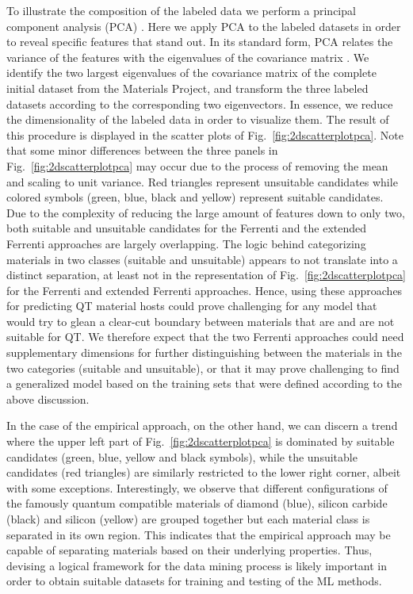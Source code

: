 \documentclass[superscriptaddress,unsortedaddress,
 amsmath,amssymb,
 aps,
]{revtex4-2}
\begin{document}
To illustrate the composition of the labeled data we perform a principal component analysis (PCA) \cite{Jolliffe2002}. Here we apply PCA to the labeled datasets in order to reveal specific features that stand out. In its standard  form, PCA relates the variance of the features with the eigenvalues of the covariance matrix \cite{Jolliffe2002,Murphy2012,Hastie2009}. We identify the two largest eigenvalues of the covariance matrix \cite{Hastie2009} of the complete initial dataset from the Materials Project, and transform the three labeled datasets according to the corresponding two eigenvectors. In essence, we reduce the dimensionality of the labeled data in order to visualize them.
The result of this procedure is displayed in the scatter plots of Fig.~\ref{fig:2dscatterplotpca}. Note that some minor differences between the three panels in Fig.~\ref{fig:2dscatterplotpca} may occur due to the process of removing the mean and scaling to unit variance. Red triangles represent unsuitable candidates while colored symbols (green, blue, black and yellow) represent suitable candidates. 
Due to the complexity of reducing the large amount of features down to only two, both suitable and unsuitable candidates for the Ferrenti and the extended Ferrenti approaches are largely overlapping. 
The logic behind categorizing materials in two classes (suitable and unsuitable) appears to not translate into a distinct separation, at least not in the representation of Fig.~\ref{fig:2dscatterplotpca} for the Ferrenti and extended Ferrenti approaches.  
Hence, using these approaches for predicting QT material hosts could prove challenging for any model that would try to glean a clear-cut boundary between materials that are and are not suitable for QT. 
We therefore expect that the two Ferrenti approaches could need supplementary dimensions for further distinguishing between the materials in the two categories (suitable and unsuitable), or that it may prove challenging to find a generalized model based on the training sets that were defined according to the above discussion. 

In the case of the empirical approach, on the other hand, we can discern a trend where the upper left part of Fig.~\ref{fig:2dscatterplotpca} is dominated by suitable candidates (green, blue, yellow and black symbols), while the unsuitable candidates (red triangles) are similarly restricted to the lower right corner, albeit with some exceptions. 
Interestingly, we observe that different configurations of the famously quantum compatible materials of diamond (blue), silicon carbide (black) and silicon (yellow) are grouped together but each material class is separated in its own region. 
This indicates that the empirical approach may be capable of separating materials based on their underlying properties. Thus, devising a logical framework for the data mining process is likely important in order to obtain suitable datasets for training and testing of the ML methods. 
\end{document}
